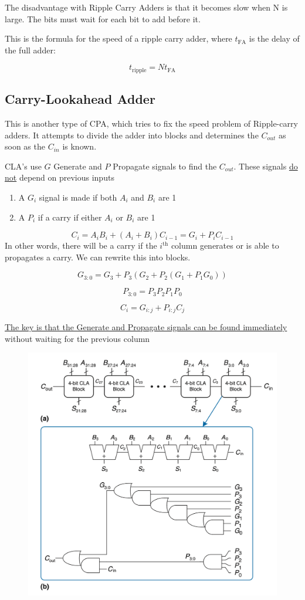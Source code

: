 \documentclass[12pt]{report}
\begin{document}
\noindent The disadvantage with Ripple Carry Adders is that it becomes slow when N is large. 
The bits must wait for each bit to add before it. 

\smallbreak 
\noindent
This is the formula for the speed of a ripple carry adder, where $t_{\mathrm{FA}}$ is the delay of the full adder:

\[
  t_{\mathrm{ripple}} = Nt_{\mathrm{FA}}
\]
\pagebreak

\subsection{Carry-Lookahead Adder}
\noindent This is another type of CPA, which tries to fix the speed problem of Ripple-carry adders. 
It attempts to divide the adder into blocks and determines the $C_{out}$ as soon as the $C_{in}$ is known.

\bigbreak
\noindent CLA's use $G$ Generate and $P$ Propagate signals to find the $C_{out}$. These signals \underline{do not} depend on previous inputs

\bigskip
\begin{enumerate}
  \item \noindent A $G_i$ signal is made if both $A_i$ and $B_i$ are 1 
  \item \noindent A $P_i$ if a carry if either $A_i$ or $B_i$ are 1
\end{enumerate}
\[
C_i = A_i B_i + (A_i + B_i)C_{i-1} = G_i + P_i C_{i-1}
\]
\noindent In other words, there will be a carry if the $i^{\mathrm{th}}$ column generates or is able to propagates a carry. 
We can rewrite this into blocks.

\[
  G_{3:0} = G_3 + P_3 (G_2 + P_2 (G_1 + P_1 G_0))
\]

\[
  P_{3:0} = P_3 P_2 P_1 P_0
\]

\[
  \boxed{C_i = G_{i:j} + P_{i:j}C_j}
\]

\noindent \underline{The key is that the Generate and Propagate signals can be found immediately}
\noindent without waiting for the previous column

\begin{figure}[h!]
  \centering
  \includegraphics[width=.5\textwidth]{Carry-lookahead.png}
\end{figure}
\end{document}
